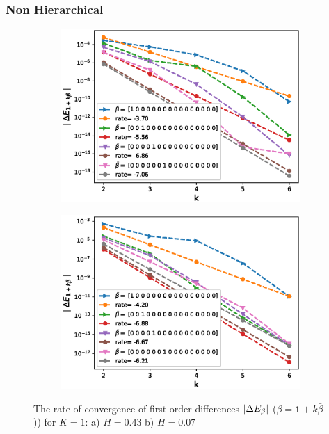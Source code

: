 \documentclass[11pt]{article}
\begin{document}
\newpage
\subsubsection{Non  Hierarchical}
\begin{figure}[h!]
	\centering
	\begin{subfigure}{.5\textwidth}
		\centering
		\includegraphics[width=1\linewidth]{./figures/effect_H_differences/non_hierarchical/H_043/N_8/first_difference_rbergomi_8steps_H_043_K_1_non_hierarch_with_rate_W1.eps}
		\caption{}
		\label{fig:sub3}
	\end{subfigure}%
	\begin{subfigure}{.5\textwidth}
		\centering
		\includegraphics[width=1\linewidth]{./figures/effect_H_differences/non_hierarchical/H_007/N_8/first_difference_rbergomi_8steps_H_007_K_1_non_hierarch_with_rate_W1.eps}
		\caption{}
		\label{fig:sub4}
	\end{subfigure}
	
	\caption{The rate of convergence of  first order differences $\left\lvert\Delta E_{\beta}\right\rvert$ ($\beta=\mathbf{1}+k \bar{\beta}$)) for $K=1$: a) $H=0.43$ b)  $H=0.07$}
	\label{fig:test2}
\end{figure}
\end{document}
